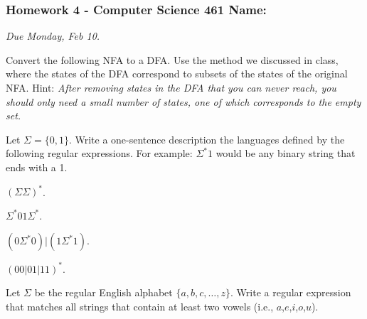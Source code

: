 \documentclass[12pt]{exam}
\begin{document}
\pagestyle{empty}
\subsubsection*{Homework 4 - Computer Science 461 \hfill Name: \underline{\hspace*{2in}}}

\textit{Due Monday, Feb 10.} %

\begin{questions}

\question Convert the following NFA to a DFA. Use the method we discussed in class, where the states of the DFA correspond to subsets of the states of the original NFA.  Hint: \textit{After removing states in the DFA that you can never reach, you should only need a small number of states, one of which corresponds to the empty set.}
\begin{flushright}
\end{flushright}
\vfill

\question Let $\Sigma = \{0,1\}$.  Write a one-sentence description the languages defined by the following regular expressions.  For example: $\Sigma^*1$ would be any binary string that ends with a 1. 
\begin{parts}
\item $(\Sigma \Sigma)^*$. 
\vfill

\item $\Sigma^*01\Sigma^*$. 
\vfill

\item $(0\Sigma^*0)|(1\Sigma^*1)$.
\vfill

\item $(00|01|11)^*$.
\vfill
\end{parts}

\question Let $\Sigma$ be the regular English alphabet $\{a,b,c,\ldots,z\}$.  Write a regular expression that matches all strings that contain at least two vowels (i.e., $a$,$e$,$i$,$o$,$u$).  


\end{questions}
\end{document}
